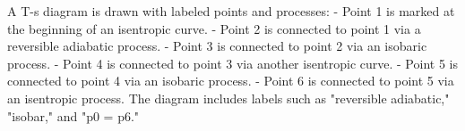 A T-s diagram is drawn with labeled points and processes:  
- Point 1 is marked at the beginning of an isentropic curve.  
- Point 2 is connected to point 1 via a reversible adiabatic process.  
- Point 3 is connected to point 2 via an isobaric process.  
- Point 4 is connected to point 3 via another isentropic curve.  
- Point 5 is connected to point 4 via an isobaric process.  
- Point 6 is connected to point 5 via an isentropic process.  
The diagram includes labels such as "reversible adiabatic," "isobar," and "p0 = p6."